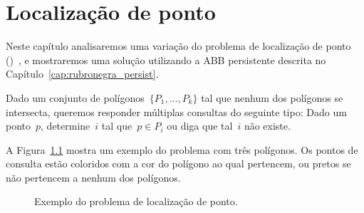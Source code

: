 \documentclass[main.tex]{subfiles}
\begin{document}
\chapter{Localização de ponto} \label{cap:pl_persist}

Neste capítulo analisaremos uma variação do problema de localização de ponto ()~\cite{SarnakT1986}, e mostraremos uma solução utilizando a ABB persistente descrita no Capítulo~\ref{cap:rubronegra_persist}.

Dado um conjunto de polígonos~${\{P_1, \ldots, P_k\}}$ tal que nenhum dos polígonos se intersecta, queremos responder múltiplas consultas do seguinte tipo: Dado um ponto~$p$, determine~$i$ tal que~${p \in P_i}$ ou diga que tal~$i$ não existe.

A Figura~\ref{fig:exemplo_pl} mostra um exemplo do problema com três polígonos. Os pontos de consulta estão coloridos com a cor do polígono ao qual pertencem, ou pretos se não pertencem a nenhum dos polígonos.

\begin{figure}[h]
\centering
{}
\caption{Exemplo do problema de localização de ponto.} \label{fig:exemplo_pl}
\end{figure}
\end{document}

